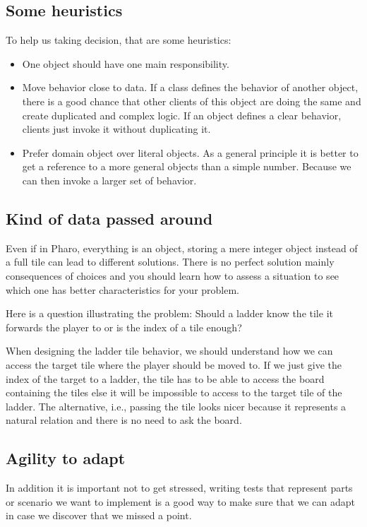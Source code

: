 \documentclass[10pt,twoside,english]{_support/latex/sbabook/sbabook}
\begin{document}
\subsection{Some heuristics}
To help us taking decision, that are some heuristics: 

\begin{itemize}
\item One object should have one main responsibility.
\item Move behavior close to data. If a class defines the behavior of another object, there is a good chance that other clients of this object are doing the same and create duplicated and complex logic. If an object defines a clear behavior, clients just invoke it without duplicating it.
\item Prefer domain object over literal objects. As a general principle it is better to get a reference to a more general objects than a simple number. Because we can then invoke a larger set of behavior. 
\end{itemize}
\subsection{Kind of data passed around}
Even if in Pharo, everything is an object, storing a mere integer object instead of a full tile can lead to different solutions. There is no perfect solution mainly consequences of choices and you should learn how to assess a situation to see which one has better characteristics for your problem. 

Here is a question illustrating the problem: Should a ladder know the tile it forwards the player to or is the index of a tile enough?

When designing the ladder tile behavior, we should understand how we can
access the target tile where the player should be moved to. 
If we just give the index of the target to a ladder, the tile has to be able to access the board containing the tiles else it will be impossible to access to the target tile of the ladder. The alternative, i.e., passing the tile looks nicer because it represents a natural relation and there is no need to ask the board. 
\subsection{Agility to adapt}
In addition it is important not to get stressed, writing tests that represent parts  or scenario 
we want to implement is a good way to make sure that we can adapt in case we discover that we missed a point. 
\end{document}
